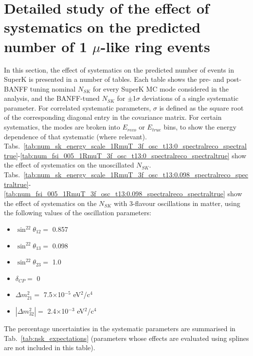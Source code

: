 \clearpage

\section{Detailed study of the effect of systematics on the predicted number of 1 $\mu$-like ring events}
\label{appendix:nsk_systematics}

In this section, the effect of systematics on the predicted number of events in SuperK is presented in a number of tables. 
Each table shows the pre- and post-BANFF tuning nominal $N_{SK}$ for every SuperK MC mode considered in the analysis, and 
the BANFF-tuned $N_{SK}$ for $\pm$1$\sigma$ deviations of a single systematic parameter. For correlated systematic parameters, 
$\sigma$ is defined as the square root of the corresponding diagonal entry in the covariance matrix.
For certain systematics, the modes are broken into $E_{reco}$ or $E_{true}$ bins, to show the energy dependence of that systematic 
(where relevant).
Tabs.\ \ref{tab:num_sk_energy_scale_1RmuT_3f_osc_t13:0_spectralreco_spectraltrue}-\ref{tab:num_fsi_005_1RmuT_3f_osc_t13:0_spectralreco_spectraltrue} 
show the effect of systematics on the unoscillated $N_{SK}$.
Tabs.\ \ref{tab:num_sk_energy_scale_1RmuT_3f_osc_t13:0.098_spectralreco_spectraltrue}-\ref{tab:num_fsi_005_1RmuT_3f_osc_t13:0.098_spectralreco_spectraltrue} 
show the effect of systematics on the $N_{SK}$ with 3-flavour oscillations in matter, using the following values of the oscillation parameters:
\begin{itemize}
\item $\sin^22\theta_{12} = $ 0.857
\item $\sin^22\theta_{13} = $ 0.098
\item $\sin^22\theta_{23} = $ 1.0
\item $\delta_{CP} = $        0
\item $\Delta m^2_{21} = $    7.5$\times$10$^{-5}$ eV$^{2}$/c$^{4}$
\item $|\Delta m^2_{32}| = $  2.4$\times$10$^{-3}$ eV$^{2}$/c$^{4}$
\end{itemize}
The percentage uncertainties in the systematic parameters are summarised in Tab.\ \ref{tab:nsk_expectations} (parameters whose effects 
are evaluated using splines are not included in this table).







